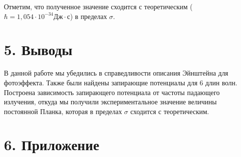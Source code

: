 \documentclass[a4paper,12pt]{report}
\begin{document}
Отметим, что полученное значение сходится с теоретическим ($\hbar = 1,054 \cdot 10^{-34} \text{Дж}\cdot\text{с}$) в пределах $\sigma$.

\section*{5. Выводы}
В данной работе мы убедились в справедливости описания Эйнштейна для фотоэффекта. Также были найдены запирающие потенциалы для 6 длин волн. Построена зависимость запирающего потенциала от частоты падающего излучения, откуда мы получили экспериментальное значение величины постоянной Планка, которая в пределах $\sigma$ сходится с теоретическим.
	
\section*{6. Приложение}
\end{document}
